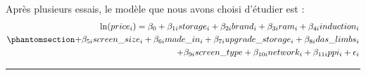 \documentclass[
  12pt,
]{report}
\begin{document}
\vspace{3em}

Après plusieurs essais, le modèle que nous avons choisi d'étudier est :
\begin{equation}\phantomsection\label{eq-log-hedonic}{
\begin{split}
\ln(price_i) = \beta_0 + \beta_{1i} storage_i + \beta_{2i}brand_i + \beta_{3i}ram_i + \beta_{4i}induction_i \\
+ \beta_{5i}screen\_size_i + \beta_{6i}made\_in_i + \beta_{7i}upgrade\_storage_i + \beta_{8i}das\_limbs_i  \\
+ \beta_{9i}screen\_type + \beta_{10i}network_i + \beta_{11i}ppi_i + \epsilon_i
\end{split}
}\end{equation}

\begin{center}\rule{0.5\linewidth}{0.5pt}\end{center}

\newpage

\vspace{15em}
\end{document}

